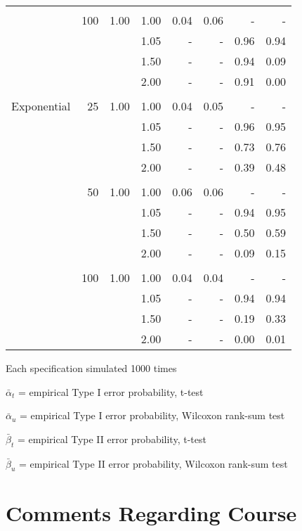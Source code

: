 \documentclass{report}
\begin{document}
\begin{table}[h]
\begin{threeparttable}
\begin{tabular}{|l r r r r r r r|}
			& & & & & & & \\
			& 100 & 1.00 & 1.00 & 0.04 & 0.06 & - & - \\ 
			&  & & 1.05 & - & - & 0.96 & 0.94 \\ 
			&  & & 1.50 & - & - & 0.94 & 0.09 \\ 
			&  & & 2.00 & - & - & 0.91 & 0.00 \\ 
			& & & & & & & \\
			Exponential &  25 & 1.00 & 1.00 & 0.04 & 0.05 & - & - \\ 
			&   & & 1.05 & - & - & 0.96 & 0.95 \\ 
			&   & & 1.50 & - & - & 0.73 & 0.76 \\ 
			&   & & 2.00 & - & - & 0.39 & 0.48 \\ 
			& & & & & & & \\
			&  50 & 1.00 & 1.00 & 0.06 & 0.06 & - & - \\ 
			&   & & 1.05 & - & - & 0.94 & 0.95 \\ 
			&   & & 1.50 & - & - & 0.50 & 0.59 \\ 
			&   & & 2.00 & - & - & 0.09 & 0.15 \\ 
			& & & & & & & \\
			& 100 & 1.00 & 1.00 & 0.04 & 0.04 & - & - \\ 
			&  & & 1.05 & - & - & 0.94 & 0.94 \\ 
			&  & & 1.50 & - & - & 0.19 & 0.33 \\ 
			&  & & 2.00 & - & - & 0.00 & 0.01 \\ 

			\hline
		\end{tabular}
		\begin{tablenotes}
		\item Each specification simulated 1000 times
		\item $\bar{\alpha}_t$ = empirical Type I error probability, t-test
		\item $\bar{\alpha}_u$ = empirical Type I error probability,
			Wilcoxon rank-sum test
		\item $\bar{\beta}_t$ = empirical Type II error probability, t-test
		\item $\bar{\beta}_u$ = empirical Type II error probability, Wilcoxon rank-sum test
		\end{tablenotes}
	\end{threeparttable}
\end{table}

\section*{Comments Regarding Course}
\end{document}
